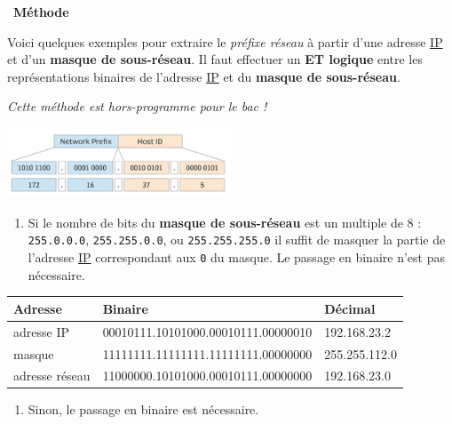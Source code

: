 \documentclass[
  11pt,
]{article}
\newcommand{\passthrough}[1]{#1}
\providecommand{\tightlist}{%
  \setlength{\itemsep}{0pt}\setlength{\parskip}{0pt}}
\newcounter{def}
\newcounter{prog}
\newcounter{logi}
\newenvironment{methode}[1]
{\par \medskip    \noindent  
 \begin {bclogo}[arrondi =0.1,logo=\bcoutil, marge=4,noborder = true] {~\textbf{Méthode}   {\itshape #1} }  \par}
{
\end{bclogo}
 \par \bigskip }
\begin{document}
\begin{methode}{}

Voici quelques exemples pour extraire le \emph{préfixe réseau} à partir
d'une adresse \href{https://fr.wikipedia.org/wiki/Internet_Protocol}{IP}
et d'un \textbf{masque de sous-réseau}. Il faut effectuer un \textbf{ET
logique} entre les représentations binaires de l'adresse
\href{https://fr.wikipedia.org/wiki/Internet_Protocol}{IP} et du
\textbf{masque de sous-réseau}.

\emph{Cette méthode est hors-programme pour le bac !}

\includegraphics[width=0.5\textwidth,height=\textheight]{images/ip-subnet.png}\\

\begin{enumerate}
\def\labelenumi{\arabic{enumi}.}
\tightlist
\item
  Si le nombre de bits du \textbf{masque de sous-réseau} est un multiple
  de 8 : \passthrough{\lstinline!255.0.0.0!},
  \passthrough{\lstinline!255.255.0.0!}, ou
  \passthrough{\lstinline!255.255.255.0!} il suffit de masquer la partie
  de l'adresse
  \href{https://fr.wikipedia.org/wiki/Internet_Protocol}{IP}
  correspondant aux \passthrough{\lstinline!0!} du masque. Le passage en
  binaire n'est pas nécessaire.
\end{enumerate}

\begin{longtable}[]{@{}lll@{}}
\toprule
Adresse & Binaire & Décimal \\
\midrule
\endhead
adresse IP & 00010111.10101000.00010111.00000010 & 192.168.23.2 \\
masque & 11111111.11111111.11111111.00000000 & 255.255.112.0 \\
adresse réseau & 11000000.10101000.00010111.00000000 & 192.168.23.0 \\
\bottomrule
\end{longtable}

\begin{enumerate}
\def\labelenumi{\arabic{enumi}.}
\setcounter{enumi}{1}
\tightlist
\item
  Sinon, le passage en binaire est nécessaire.
\end{enumerate}


\end{methode}
\end{document}
